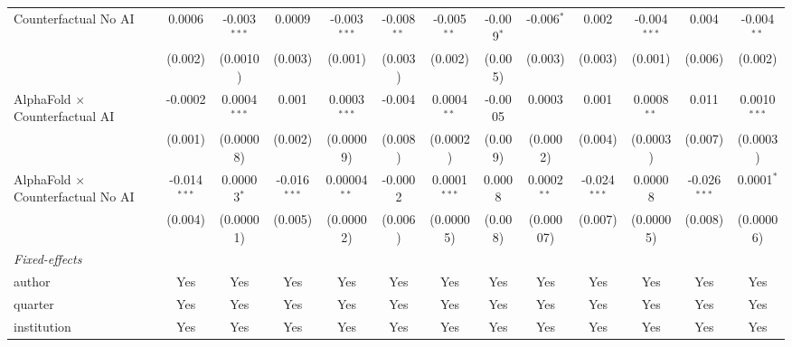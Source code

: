 \begin{tabular}{lcccccccccccc}
   Counterfactual No AI                     & 0.0006         & -0.003$^{***}$ & 0.0009         & -0.003$^{***}$ & -0.008$^{**}$  & -0.005$^{**}$  & -0.009$^{*}$   & -0.006$^{*}$  & 0.002          & -0.004$^{***}$ & 0.004          & -0.004$^{**}$\\   
                                            & (0.002)        & (0.0010)       & (0.003)        & (0.001)        & (0.003)        & (0.002)        & (0.005)        & (0.003)       & (0.003)        & (0.001)        & (0.006)        & (0.002)\\   
   AlphaFold $\times$ Counterfactual AI     & -0.0002        & 0.0004$^{***}$ & 0.001          & 0.0003$^{***}$ & -0.004         & 0.0004$^{**}$  & -0.0005        & 0.0003        & 0.001          & 0.0008$^{**}$  & 0.011          & 0.0010$^{***}$\\   
                                            & (0.001)        & (0.00008)      & (0.002)        & (0.00009)      & (0.008)        & (0.0002)       & (0.009)        & (0.0002)      & (0.004)        & (0.0003)       & (0.007)        & (0.0003)\\   
   AlphaFold $\times$ Counterfactual No AI  & -0.014$^{***}$ & 0.00003$^{*}$  & -0.016$^{***}$ & 0.00004$^{**}$ & -0.0002        & 0.0001$^{***}$ & 0.0008         & 0.0002$^{**}$ & -0.024$^{***}$ & 0.00008        & -0.026$^{***}$ & 0.0001$^{*}$\\   
                                            & (0.004)        & (0.00001)      & (0.005)        & (0.00002)      & (0.006)        & (0.00005)      & (0.008)        & (0.00007)     & (0.007)        & (0.00005)      & (0.008)        & (0.00006)\\   
   \midrule
   \emph{Fixed-effects}\\
   author                                   & Yes            & Yes            & Yes            & Yes            & Yes            & Yes            & Yes            & Yes           & Yes            & Yes            & Yes            & Yes\\  
   quarter                                  & Yes            & Yes            & Yes            & Yes            & Yes            & Yes            & Yes            & Yes           & Yes            & Yes            & Yes            & Yes\\  
   institution                              & Yes            & Yes            & Yes            & Yes            & Yes            & Yes            & Yes            & Yes           & Yes            & Yes            & Yes            & Yes\\  

\end{tabular}
